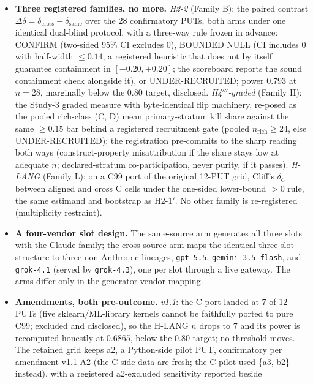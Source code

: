 \documentclass[manuscript,screen,review]{acmart}
\begin{document}
\begin{itemize}

\item
  \textbf{Three registered families, no more.} \emph{H2-2} (Family B): the
  paired contrast \(\Delta\delta = \delta_{\mathrm{cross}} -
  \delta_{\mathrm{same}}\) over the 28 confirmatory PUTs, both arms under one
  identical dual-blind protocol, with a three-way rule frozen in advance:
  CONFIRM (two-sided 95\% CI excludes 0), BOUNDED NULL (CI includes 0 with
  half-width \(\leq 0.14\), a registered heuristic that does not by itself
  guarantee containment in \([-0.20, +0.20]\); the scoreboard reports the
  sound containment check alongside it), or UNDER-RECRUITED; power 0.793 at
  \(n = 28\), marginally below the 0.80 target, disclosed.
  \emph{H4\('''\)-graded} (Family H): the Study-3 graded measure with
  byte-identical flip machinery, re-posed as the pooled rich-class (C, D)
  mean primary-stratum kill share against the same \(\geq 0.15\) bar behind a
  registered recruitment gate (pooled \(n_{\mathrm{rich}} \geq 24\), else
  UNDER-RECRUITED); the registration pre-commits to the sharp reading both
  ways (construct-property misattribution if the share stays low at adequate
  \(n\); declared-stratum co-participation, never purity, if it
  passes). \emph{H-LANG}
  (Family L): on a C99 port of the original 12-PUT grid, Cliff's \(\delta_C\)
  between aligned and cross C cells under the one-sided lower-bound \(> 0\)
  rule, the same estimand and bootstrap as H2-1\('\). No other family is
  re-registered (multiplicity restraint).
\item
  \textbf{A four-vendor slot design.} The same-source arm generates all three
  slots with the Claude family; the cross-source arm maps the identical
  three-slot structure to three non-Anthropic lineages, \texttt{gpt-5.5},
  \texttt{gemini-3.5-flash}, and \texttt{grok-4.1} (served by
  \texttt{grok-4.3}), one per slot through a live gateway. The arms differ
  only in the generator-vendor mapping.
\item
  \textbf{Amendments, both pre-outcome.} \emph{v1.1}: the C port landed at 7
  of 12 PUTs (five sklearn/ML-library kernels cannot be faithfully ported to
  pure C99; excluded and disclosed), so the H-LANG \(n\) drops to 7 and its
  power is recomputed honestly at 0.6865, below the 0.80 target; no threshold
  moves. The retained grid keeps a2, a Python-side pilot PUT, confirmatory
  per amendment v1.1 A2 (the C-side data are fresh; the C pilot used \{a3,
  b2\} instead), with a registered a2-excluded sensitivity reported beside

\end{itemize}
\end{document}
